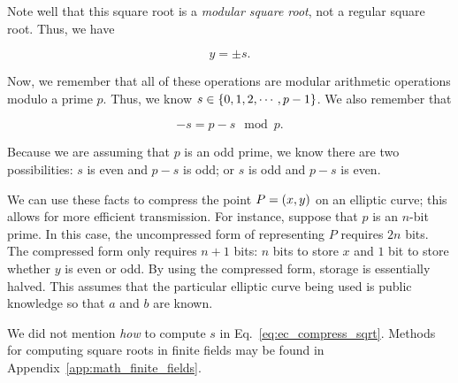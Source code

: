 \noindent
Note well that this square root is a \emph{modular square root},
not a regular square root.
Thus, we have

\begin{equation}
    y = \pm s.
\end{equation}

Now, we remember that all of these operations are modular arithmetic
operations modulo a prime $p$.
Thus, we know $s\in\left\{ 0, 1, 2, \cdots, p-1 \right\}$.
We also remember that

\begin{equation}
    -s = p - s \mod p.
\end{equation}

\noindent
Because we are assuming that $p$ is an odd prime,
we know there are two possibilities:
$s$ is even and $p-s$ is odd; or
$s$ is odd and $p-s$ is even.

We can use these facts to compress the point $P = \left( x,y \right)$
on an \gls{elliptic curve};
this allows for more efficient transmission.
For instance, suppose that $p$ is an $n$-bit prime.
In this case, the uncompressed form of representing $P$
requires $2n$ bits.
The compressed form only requires $n+1$ bits: $n$ bits to store $x$
and $1$ bit to store whether $y$ is even or odd.
By using the compressed form, storage is essentially halved.
This assumes that the particular \gls{elliptic curve} being used
is public knowledge so that $a$ and $b$ are known.

We did not mention \emph{how} to compute $s$ in
Eq.~\eqref{eq:ec_compress_sqrt}.
Methods for computing square roots in \glspl{finite field}
may be found in Appendix~\ref{app:math_finite_fields}.

